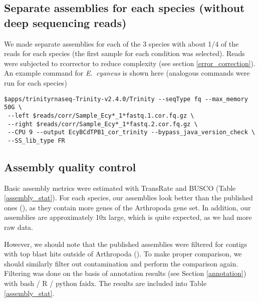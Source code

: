 \documentclass[12pt]{article}
\begin{document}
\subsection{Separate assemblies for each species (without deep sequencing reads)}

We made separate assemblies for each of the 3 species with about 1/4 of the reads for each species (the first sample for each condition was selected). Reads were subjected to rcorrector to reduce complexity (see section \ref{error_correction}). An example command for \textit{E.~cyaneus} is shown here (analogous commands were run for each species)

\begin{verbatim}
$apps/trinityrnaseq-Trinity-v2.4.0/Trinity --seqType fq --max_memory 50G \
 --left $reads/corr/Sample_Ecy*_1*fastq.1.cor.fq.gz \ 
 --right $reads/corr/Sample_Ecy*_1*fastq.2.cor.fq.gz \ 
 --CPU 9 --output EcyBCdTPB1_cor_trinity --bypass_java_version_check \
 --SS_lib_type FR
\end{verbatim}

\subsection{Assembly quality control}

Basic assembly metrics were estimated with TransRate and BUSCO (Table \ref{assembly_stat}). For each species, our assemblies look better than the published ones (\cite{Naumenko2017}), as they contain more genes of the Arthropoda gene set. In addition, our assemblies are approximately 10x large, which is quite expected, as we had more raw data. 

However, we should note that the published assemblies were filtered for contigs with top blast hits outside of Arthropoda (\cite{Naumenko2017}). To make proper comparison, we should similarly filter out contamination and perform the comparison again. Filtering was done on the basis of annotation results (see Section \ref{annotation}) with bash / R / python faidx. The results are included into Table \ref{assembly_stat}.

\end{document}
